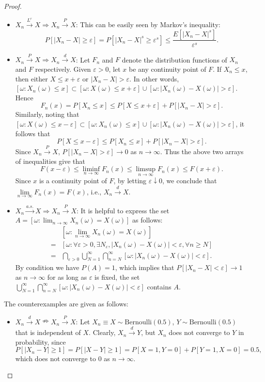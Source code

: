 \documentclass{article}
\newcommand{\eps}{\varepsilon}
\theoremstyle{definition}
\theoremstyle{plain}
\theoremstyle{remark}
\begin{document}
\begin{description}
\begin{proof}
\begin{itemize}
\item $X_n \overset{L^r}\to X \Rightarrow X_n \overset{P}\to X$: This can be easily seen by Markov's inequality:
$$P\left[|X_n - X| \geq \eps\right] = P[|X_n - X|^s \geq \eps^s] \leq \frac{E[|X_n - X|^s]}{\eps^s}.$$

\item $X_n \overset{P}\to X \Rightarrow X_n \overset{d}\to X$: Let $F_n$ and $F$ denote the distribution functions of $X_n$ and $F$ respectively. Given $\eps > 0$, let $x$ be any continuity point of $F$. If $X_n \leq x$, then either $X \leq x + \eps$ or $|X_n - X| > \eps$. In other words, $[\omega: X_n(\omega) \leq x] \subset [\omega: X(\omega) \leq x + \eps] \cup [\omega: |X_n(\omega) - X(\omega)| > \eps]$. Hence
$$F_n(x) = P[X_n \leq x] \leq P[X \leq x + \eps] + P[|X_n - X| > \eps].$$
Similarly, noting that $[\omega: X(\omega) \leq x - \eps] \subset [\omega: X_n(\omega) \leq x] \cup [\omega: |X_n(\omega) - X(\omega)| > \eps]$, it follows that
$$P[X \leq x - \eps] \leq P[X_n \leq x] + P[|X_n - X| > \eps].$$
Since $X_n \overset{P}\to X$, $P[|X_n - X| > \eps] \to 0$ as $n \to \infty$. Thus the above two arrays of inequalities give that
$$F(x - \eps) \leq \liminf_{n \to \infty} F_n(x) \leq \limsup_{n \to \infty} F_n(x) \leq F(x + \eps).$$
Since $x$ is a continuity point of $F$, by letting $\eps \downarrow 0$, we conclude that $\lim\limits_{n \to \infty} F_n(x) = F(x)$, i.e., $X_n \overset{d}\to X$.

\item $X_n \overset{a.s.}\to X \Rightarrow X_n \overset{P}\to X$: It is helpful to express the set $A = [\omega: \lim_{n \to \infty}X_n(\omega) = X(\omega)]$ as follows:
\begin{align*}
& [\omega: \lim_{n \to \infty} X_n(\omega) = X(\omega)] \\
= & [\omega: \forall \eps > 0, \exists N_\eps, |X_n(\omega) - X(\omega)| < \eps, \forall n \geq N] \\
= & \bigcap_{\eps > 0}\bigcup_{N = 1}^\infty\bigcap_{n = N}^\infty [\omega: |X_n(\omega) - X(\omega)| < \eps].
\end{align*}
By condition we have $P(A) = 1$, which implies that $P[|X_n - X| < \eps] \to 1$ as $n \to \infty$ for as long as $\eps$ is fixed, the set $\bigcup_{N = 1}^\infty\bigcap_{n = N}^\infty [\omega: |X_n(\omega) - X(\omega)| < \eps]$ contains $A$. 
\end{itemize}
The counterexamples are given as follows:
\begin{itemize}
\item $X_n \overset{d}\to X \nRightarrow X_n \overset{P}\to X$: Let $X_n \equiv X \sim \text{Bernoulli}(0.5)$, $Y \sim \text{Bernoulli}(0.5)$ that is independent of $X$. Clearly, $X_n \overset{d}\to Y$, but $X_n$ does not converge to $Y$ in probability, since 
$$P[|X_n - Y| \geq 1] = P[|X - Y| \geq 1] = P[X = 1, Y = 0] + P[Y = 1, X = 0] = 0.5,$$
which does not converge to $0$ as $n \to \infty$.


\end{itemize}
\end{proof}
\end{description}
\end{document}
